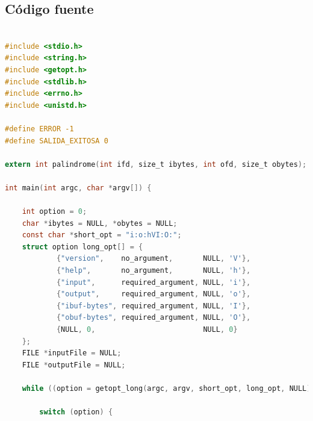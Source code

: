 \documentclass[a4paper]{article}
\begin{document}
\subsection{Código fuente}
\begin{lstlisting}[language=C]

#include <stdio.h>
#include <string.h>
#include <getopt.h>
#include <stdlib.h>
#include <errno.h>
#include <unistd.h>

#define ERROR -1
#define SALIDA_EXITOSA 0

extern int palindrome(int ifd, size_t ibytes, int ofd, size_t obytes);

int main(int argc, char *argv[]) {

    int option = 0;
    char *ibytes = NULL, *obytes = NULL;
    const char *short_opt = "i:o:hVI:O:";
    struct option long_opt[] = {
            {"version",    no_argument,       NULL, 'V'},
            {"help",       no_argument,       NULL, 'h'},
            {"input",      required_argument, NULL, 'i'},
            {"output",     required_argument, NULL, 'o'},
            {"ibuf-bytes", required_argument, NULL, 'I'},
            {"obuf-bytes", required_argument, NULL, 'O'},
            {NULL, 0,                         NULL, 0}
    };
    FILE *inputFile = NULL;
    FILE *outputFile = NULL;

    while ((option = getopt_long(argc, argv, short_opt, long_opt, NULL)) != -1){
       
        switch (option) {
           

\end{lstlisting}
\end{document}
